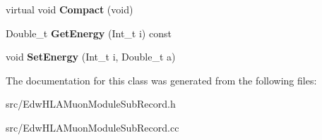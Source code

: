 \begin{DoxyCompactItemize}
\item 
\hypertarget{class_edw_h_l_a_muon_module_sub_record_ac035ea655af47dcca101d2df2965298d}{
virtual void {\bfseries Compact} (void)}
\label{class_edw_h_l_a_muon_module_sub_record_ac035ea655af47dcca101d2df2965298d}

\item 
\hypertarget{class_edw_h_l_a_muon_module_sub_record_a1b1695499afe138e0afb7ed6a080d1f3}{
Double\_\-t {\bfseries GetEnergy} (Int\_\-t i) const }
\label{class_edw_h_l_a_muon_module_sub_record_a1b1695499afe138e0afb7ed6a080d1f3}

\item 
\hypertarget{class_edw_h_l_a_muon_module_sub_record_a91e367cfce9c923e0fdf0a3762e1fac1}{
void {\bfseries SetEnergy} (Int\_\-t i, Double\_\-t a)}
\label{class_edw_h_l_a_muon_module_sub_record_a91e367cfce9c923e0fdf0a3762e1fac1}

\end{DoxyCompactItemize}


The documentation for this class was generated from the following files:\begin{DoxyCompactItemize}
\item 
src/EdwHLAMuonModuleSubRecord.h\item 
src/EdwHLAMuonModuleSubRecord.cc\end{DoxyCompactItemize}
